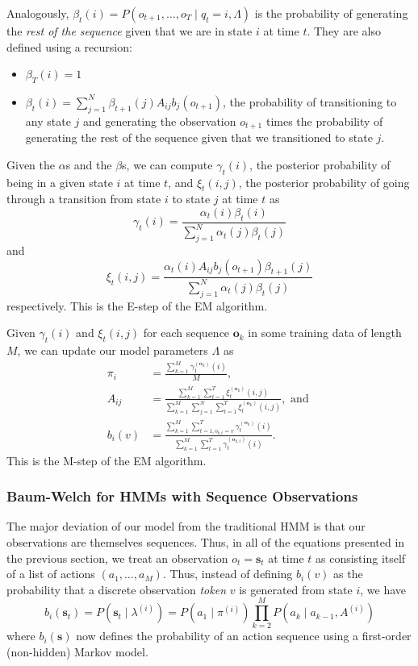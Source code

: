 Analogously, $\beta_t(i) = P(o_{t+1}, \ldots, o_{T} \mid q_t = i, \Lambda)$
is the probability of generating the \emph{rest of the sequence} given that
we are in state $i$ at time $t$. They are also defined using a recursion:
\begin{itemize}
  \item $\beta_T(i) = 1$
  \item $\beta_t(i) = \sum_{j=1}^N \beta_{t+1}(j) A_{ij} b_j(o_{t+1})$, the
    probability of transitioning to any state $j$ and generating the
    observation $o_{t+1}$ times the probability of generating the rest of
    the sequence given that we transitioned to state $j$.
\end{itemize}

Given the $\alpha$s and the $\beta$s, we can compute $\gamma_t(i)$, the posterior
probability of being in a given state $i$ at time $t$, and $\xi_t(i,j)$,
the posterior probability of going through a transition from state $i$ to
state $j$ at time $t$ as
\begin{equation}
  \gamma_t(i) = \frac{\alpha_t(i)\beta_t(i)}{\sum_{j=1}^N
  \alpha_t(j)\beta_t(j)}
\end{equation}
and
\begin{equation}
  \xi_t(i,j) = \frac{\alpha_t(i) A_{ij} b_j(o_{t+1}) \beta_{t+1}(j)}
  {\sum_{j=1}^N \alpha_t(j)\beta_t(j)}
\end{equation}
respectively. This is the E-step of the EM algorithm.

Given $\gamma_t(i)$ and $\xi_t(i,j)$ for each sequence $\mathbf{o}_k$ in
some training data of length $M$, we can update our model parameters
$\Lambda$ as
\begin{align}
  \pi_i &= \frac{\sum_{k=1}^M \gamma^{(\mathbf{o}_k)}_1(i)}{M},\\
  A_{ij} &= \frac{\sum_{k=1}^M \sum_{t=1}^T \xi^{(\mathbf{o}_k)}_t(i,j)}
  {\sum_{k=1}^M \sum_{j=1}^N \sum_{t=1}^T \xi^{(\mathbf{o}_k)}_t(i,j)},
  \text{ and }\\
  b_i(v) &= \frac{\sum_{k=1}^M \sum_{t=1, o_{k,t} = v}^T
  \gamma^{(\mathbf{o}_k)}_t(i)}
  {\sum_{k=1}^M \sum_{t=1}^T \gamma^{(\mathbf{o}_{k,t})}_t(i)}.
\end{align}
This is the M-step of the EM algorithm.

\subsubsection{Baum-Welch for HMMs with Sequence Observations}
The major deviation of our model from the traditional HMM is that our
observations are themselves sequences. Thus, in all of the equations
presented in the previous section, we treat an observation $o_t =
\mathbf{s}_t$ at time $t$ as consisting itself of a list of actions $(a_1,
\ldots, a_M)$. Thus, instead of defining $b_i(v)$ as the probability that a
discrete observation \emph{token} $v$ is generated from state $i$, we have
\begin{equation}
  b_i(\mathbf{s}_t) = P(\mathbf{s}_t \mid \lambda^{(i)})
  = P(a_1 \mid \pi^{(i)}) \prod_{k=2}^M P(a_k \mid
  a_{k-1}, A^{(i)})
\end{equation}
where $b_i(\mathbf{s})$ now defines the probability of an action sequence
using a first-order (non-hidden) Markov model.

